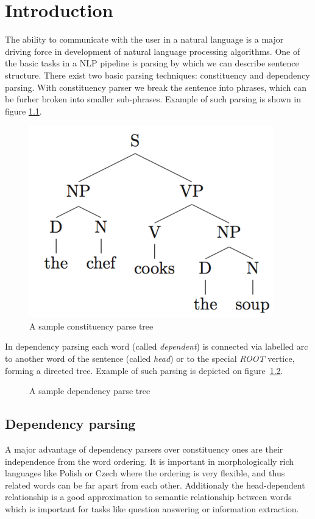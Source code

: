 \chapter{Introduction}
The ability to communicate with the user in a natural language is a major driving
force in development of natural language processing algorithms. One of the basic
tasks in a NLP pipeline is parsing by which we can describe sentence structure.
There exist two basic parsing techniques: constituency and dependency parsing.
With constituency parser we break the sentence into phrases, which can be furher
broken into smaller sub-phrases. Example of such parsing is shown in figure
\ref{fig:constituency_tree}.

\begin{figure}[!htbp]
  \centering
  \includegraphics[width=0.4\linewidth]{img/examples/dep/constituent.png}
  \caption{A sample constituency parse tree} 
  \label{fig:constituency_tree}
\end{figure}

In dependency parsing each word (called \emph{dependent})
is connected via labelled arc to another word of the sentence (called \emph{head})
or to the special \emph{ROOT} vertice, forming a directed tree.
Example of such parsing is depicted on figure~\ref{fig:dependency_tree}.

\begin{figure}[!htbp]
  \centering
  \caption{A sample dependency parse tree} 
  \label{fig:dependency_tree}
\end{figure}

\section{Dependency parsing}

A major advantage of dependency parsers over constituency ones are their
independence from the word ordering. It is important in morphologically rich
languages like Polish or Czech where the ordering is very flexible, and thus
related words can be far apart from each other.
Additionaly the head-dependent relationship is a good approximation to semantic
relationship between words~\cite{covington_fundamental_2001} which is important
for tasks like question answering or information extraction.

